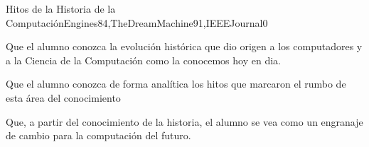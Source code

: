 \begin{syllabus}
\begin{unit}{Hitos de la Historia de la Computación}{Engines84,TheDreamMachine91,IEEEJournal}{0}
   \begin{learningoutcomes}
     	\item Que el alumno conozca la evolución histórica que dio origen a los computadores y a la Ciencia de la Computación como la conocemos hoy en dia.
	\item Que el alumno conozca de forma analítica los hitos que marcaron el rumbo de esta área del conocimiento
	\item Que, a partir del conocimiento de la historia, el alumno se vea como un engranaje de cambio para la computación del futuro.
   \end{learningoutcomes}
\end{unit}

\begin{coursebibliography}
\end{coursebibliography}
\end{syllabus}

